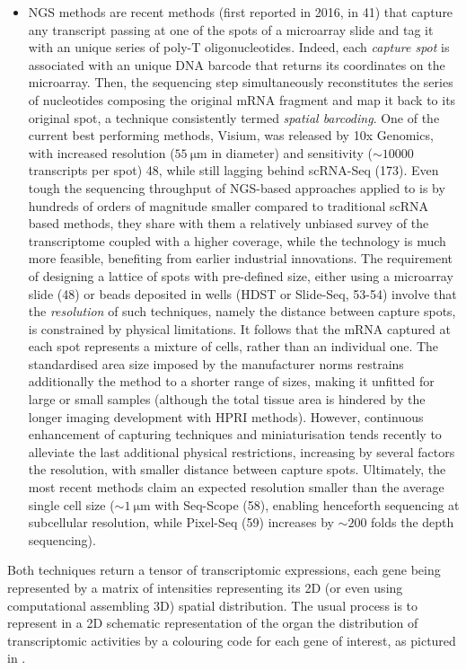 \begin{itemize}
    \item[NGS sequencing] NGS methods are recent methods (first reported in 2016, in 41) that capture any transcript passing at one of the spots of a microarray slide and tag it with an unique series of poly-T oligonucleotides. Indeed, each \textit{capture spot} is associated with an unique DNA barcode that returns its coordinates on the microarray. Then, the sequencing step simultaneously reconstitutes the series of nucleotides composing the original mRNA fragment and map it back to its original spot, a technique consistently termed \textit{spatial barcoding}. One of the current best performing methods, Visium, was released by 10x Genomics, with increased resolution ($\SI{55}{\micro \metre}$ in diameter) and sensitivity ($\sim \num{10000}$ transcripts per spot) 48, while still lagging behind scRNA-Seq (173). 
    Even tough the sequencing throughput of NGS-based approaches applied to is by hundreds of orders of magnitude smaller compared to traditional scRNA based methods, they share with them a relatively unbiased survey of the transcriptome coupled with a higher coverage, while the technology is much more feasible, benefiting from earlier industrial innovations. 
    The requirement of designing a lattice of spots with pre-defined size, either using a microarray slide (48) or beads deposited in wells (HDST or Slide-Seq, 53-54) involve that the \textit{resolution} of such techniques, namely the distance between capture spots, is constrained by physical limitations. It follows that the mRNA captured at each spot represents a mixture of cells, rather than an individual one. The standardised area size imposed by the manufacturer norms restrains additionally the method to a shorter range of sizes, making it unfitted for large or small samples (although the total tissue area is hindered by the longer imaging development with HPRI methods).  However, continuous enhancement of capturing techniques and miniaturisation tends recently to alleviate the last additional physical restrictions, increasing by several factors the resolution, with smaller distance between capture spots. Ultimately, the most recent methods claim an expected resolution smaller than the average single cell size ($\sim \SI{1}{\micro \metre}$ with Seq-Scope (58), enabling henceforth sequencing at subcellular resolution, while Pixel-Seq (59) increases by $\sim 200$ folds the depth sequencing).
    
\end{itemize}

Both techniques return a tensor of transcriptomic expressions, each gene being represented by a matrix of intensities representing its 2D (or even using computational assembling 3D) spatial distribution. The usual process is to represent in a 2D schematic representation of the organ the distribution of transcriptomic activities by a colouring code for each gene of interest, as pictured in . 

